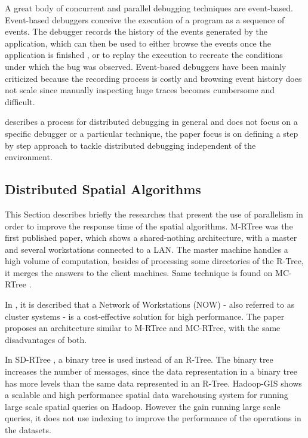A great body of concurrent and parallel debugging techniques are event-based. Event-based debuggers \cite{mcdowell1989Debugging} conceive the execution of a program as a sequence of events. 
The debugger records the history of the events generated by the application, which can then be used to either browse the events once the application is finished \cite{xtrace2007,causeway2009}, 
or to replay the execution to recreate the conditions under which the bug was observed. 
Event-based debuggers have been mainly criticized because the recording process is costly and browsing event history does not scale since manually inspecting huge traces becomes cumbersome and difficult.
 
\cite{cheung1990Framework} describes a process for distributed debugging in general and does not focus on a specific debugger or a particular technique, 
the paper focus is on defining a step by step approach to tackle distributed debugging independent of the environment. 
	
\subsection{Distributed Spatial Algorithms}
\label{spatialdist}

This Section describes briefly the researches that present the use of parallelism in order to improve the response time of the spatial algorithms. M-RTree \cite{koudas1996declustering} was the first published paper, 
which shows a shared-nothing architecture, with a master and several workstations connected to a LAN. The master machine handles a high volume of computation, besides of processing some directories of the R-Tree, 
it merges the answers to the client machines. Same technique is found on MC-RTree \cite{schnitzer1999master}.

In \cite{an1999storing}, it is described that a Network of Workstations (NOW) - also referred to as cluster systems  - is a cost-effective solution for high performance. 
The paper proposes an architecture similar to M-RTree and MC-RTree, with the same disadvantages of both.

In SD-RTree \cite{du2007sd}, a binary tree is used instead of an R-Tree. The binary tree increases the number of messages, since the data representation in a binary tree has more levels than the same data represented in an R-Tree. 
Hadoop-GIS \cite{kerr2009alternative} shows a scalable and high performance spatial data warehousing system for running large scale spatial queries on Hadoop. 
However the gain running large scale queries, it does not use indexing to improve the performance of the operations in the datasets.

